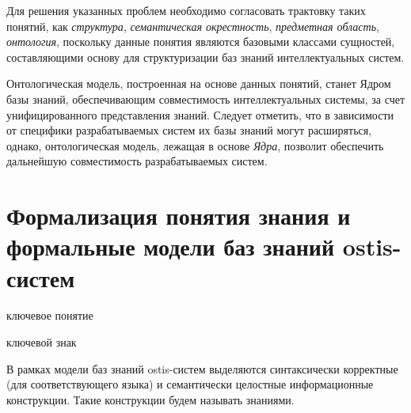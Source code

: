 Для решения указанных проблем необходимо согласовать трактовку таких понятий, как \textit{структура}, \textit{семантическая окрестность}, \textit{предметная область}, \textit{онтология}, поскольку данные понятия являются базовыми классами сущностей, составляющими основу для структуризации баз знаний интеллектуальных систем.

Онтологическая модель, построенная на основе данных понятий, станет Ядром базы знаний, обеспечивающим совместимость интеллектуальных системы, за счет унифицированного представления знаний. Следует отметить, что в зависимости от специфики разрабатываемых систем их базы знаний могут расширяться, однако, онтологическая модель, лежащая в основе \textit{Ядра}, позволит обеспечить дальнейшую совместимость разрабатываемых систем.

\section{Формализация понятия знания и формальные модели баз знаний ostis-систем}
\label{sec_kb}

\begin{SCn}
	\begin{scnrelfromlist}{ключевое понятие}
	\end{scnrelfromlist}
\end{SCn}

\begin{SCn}
	\begin{scnrelfromlist}{ключевой знак}
	\end{scnrelfromlist}
\end{SCn}


В рамках модели баз знаний ostis-систем выделяются синтаксически корректные (для соответствующего языка) и семантически целостные информационные конструкции. Такие конструкции будем называть знаниями.

\begin{SCn}
	\begin{scnindent}
	\end{scnindent}
\end{SCn}

